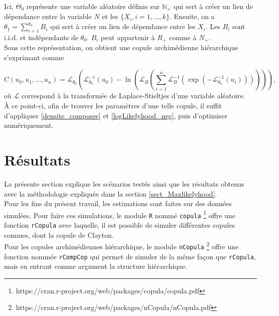 \documentclass{article}
\begin{document}
	Ici, $\Theta_0$ représente une variable aléatoire définie sur $\mathbb{N}_+$ qui sert à créer un lien de dépendance entre la variable $N$ et les $\{X_i, i=1,\dots , k\}$. Ensuite, on a $\theta_1 = \sum_{i=1}^{\theta_0} B_i$ qui sert à créer un lien de dépendance entre les $X_i$. Les $B_i$ sont i.i.d. et indépendants de $\theta_0$. $B_i$ peut appartenir à $R_+$ comme à $N_+$. \\
	
	Sous cette représentation, on obtient une copule archimédienne hiérarchique s'exprimant comme
	
	\begin{equation}
	C(u_0, u_1, \dots, u_n) =
		\mathscr{L}_{\theta_0} \left(
			\mathscr{L}_{\theta_0}^{-1}(u_0) - \ln \left( 
				\mathscr{L}_B  \left(
					\sum_{i=1}^{n} \mathscr{L}_{B}^{-1} \left(
					 \exp \left(
					  - \mathscr{L}_{\theta_0}^{-1}(u_i) 
					  \right) \right)\right)\right)\right),
	\end{equation}
	où $\mathscr{L}$ correspond à la transformée de Laplace-Stieltjes d'une variable aléatoire.\\
	
	À ce point-ci, afin de trouver les paramètres d'une telle copule, il suffit d'appliquer \eqref{densite_composee} et \eqref{logLikelyhood_neg}, puis d'optimiser numériquement.
	
	\section{Résultats}
	La présente section explique les scénarios testés ainsi que les résultats obtenus avec la méthodologie expliquée dans la section \ref{sect_Maxlikelyhood}.\\
	
	Pour les fins du présent travail, les estimations sont faites sur des données simulées. Pour faire ces simulations, le module \texttt{R} nommé \texttt{copula} \footnote{https://cran.r-project.org/web/packages/copula/copula.pdf}
	offre une fonction \texttt{rCopula} avec laquelle, il est possible de simuler différentes copules connues, dont la copule de Clayton. \\
	
	Pour les copules archimédiennes hiérarchique, le module \texttt{nCopula} \footnote{https://cran.r-project.org/web/packages/nCopula/nCopula.pdf} offre une fonction nommée \texttt{rCompCop} qui permet de simuler de la même façon que \texttt{rCopula}, mais en entrant comme argument la structure hiérarchique.
	
\end{document}
